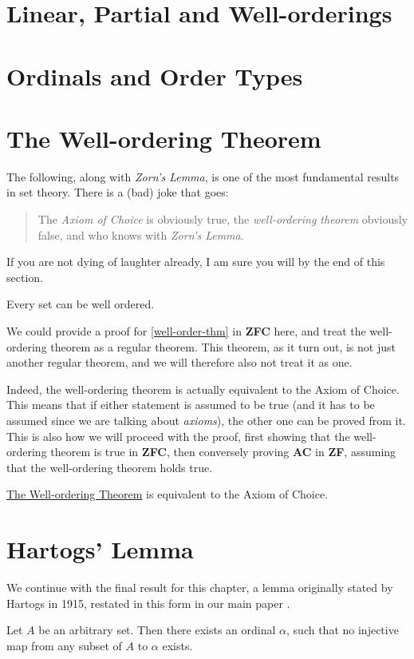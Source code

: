 \documentclass[../../main.tex]{subfiles}
\begin{document}
\section{Linear, Partial and Well-orderings}

\section{Ordinals and Order Types}

\section{The Well-ordering Theorem}
The following, along with \textit{Zorn's Lemma}, is one of the most fundamental results in set theory.
There is a (bad) joke that goes:
\begin{quote} %
    The \textit{Axiom of Choice} is obviously true, the \textit{well-ordering theorem} obviously false, 
    and who knows with \textit{Zorn's Lemma}.
\end{quote}
If you are not dying of laughter already, I am sure you will by the end of this section.

\begin{definition}\cite[Theorem 15]{Jec78}\label{well-order-thm}
    Every set can be well ordered.
\end{definition}

We could provide a proof for \ref{well-order-thm} in \textbf{ZFC} here, 
and treat the well-ordering theorem as a regular theorem.
This theorem, as it turn out, is not just another regular theorem, and we will therefore also not treat it as one.

Indeed, the well-ordering theorem is actually equivalent to the Axiom of Choice.
This means that if either statement is assumed to be true (and it has to be assumed since we are talking about \textit{axioms}),
the other one can be proved from it.
This is also how we will proceed with the proof, first showing that the well-ordering theorem is true in \textbf{ZFC},
then conversely proving \textbf{AC} in \textbf{ZF}, assuming that the well-ordering theorem holds true.

\begin{theorem}
    \hyperref[well-order-thm]{The Well-ordering Theorem} is equivalent to the Axiom of Choice. %
\end{theorem}

\section{Hartogs' Lemma}
We continue with the final result for this chapter, 
a lemma originally stated by Hartogs in 1915, restated in this form in our main paper \cite{Haj72}.

\begin{lemma}\cite{Har15}
    Let $A$ be an arbitrary set.
    Then there exists an ordinal $\alpha$, 
    such that no injective map from any subset of $A$ to $\alpha$ exists. %
\end{lemma}
\end{document}
